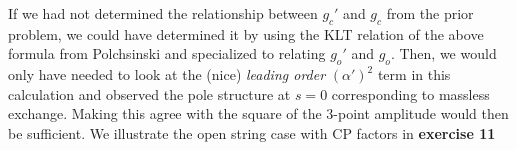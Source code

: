\documentclass[11pt, class=article, crop=false]{standalone}
\begin{document}
\begin{enumerate}
	If we had not determined the relationship between $g_c'$ and $g_c$ from the prior problem, we could have determined it by using the KLT relation of the above formula from Polchsinski and specialized to relating $g_o'$ and $g_o$. Then, we would only have needed to look at the (nice) \emph{leading order} $(\alpha')^2$ term in this calculation and observed the pole structure at $s=0$ corresponding to massless exchange. Making this agree with the square of the 3-point amplitude would then be sufficient. We illustrate the open string case with CP factors in \textbf{exercise 11}

\end{enumerate}
\end{document}
